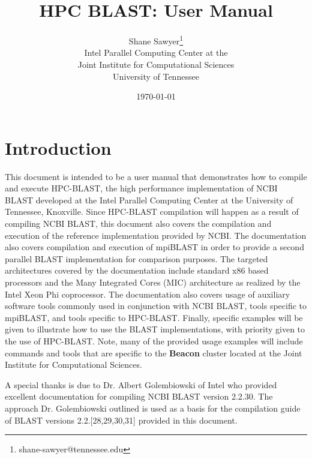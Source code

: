 \documentclass[10pt]{article}
\newcommand{\beac}{\textbf{Beacon }}
\begin{document}
\title{HPC BLAST: User Manual\\
         }
\author{Shane Sawyer\thanks{shane-sawyer@tennessee.edu}\\
   Intel Parallel Computing Center at the\\
   Joint Institute for Computational Sciences\\University of Tennessee}
\date{\today}
\maketitle

\newpage

\tableofcontents

\newpage



\section{Introduction} \label{sec:intro}

This document is intended to be a user manual that demonstrates how to compile and execute HPC-BLAST, the high performance implementation of NCBI BLAST developed at the Intel Parallel Computing Center at the University of Tennessee, Knoxville.
Since HPC-BLAST compilation will happen as a result of compiling NCBI BLAST, this document also covers the compilation and execution of the reference implementation provided by NCBI.  The documentation also covers compilation and execution of mpiBLAST in order to
provide a second parallel BLAST implementation for comparison purposes.  The targeted architectures covered by the documentation include standard x86 based processors and the Many Integrated Cores (MIC) architecture as realized by the Intel Xeon
Phi coprocessor.  The documentation also covers usage of auxiliary software tools commonly used in conjunction with NCBI BLAST, tools specific to mpiBLAST, and tools specific to HPC-BLAST.  Finally, specific examples will be given to illustrate how to
use the BLAST implementations, with priority given to the use of HPC-BLAST.  Note, many of the provided usage examples will include commands and tools that are specific to the \beac cluster located at the Joint Institute for Computational Sciences.

A special thanks is due to Dr. Albert Golembiowski of Intel who provided excellent documentation for compiling NCBI BLAST version 2.2.30.  The approach Dr. Golembiowski outlined is used as a basis for the compilation guide of BLAST versions 2.2.[28,29,30,31]
provided in this document.
\end{document}
